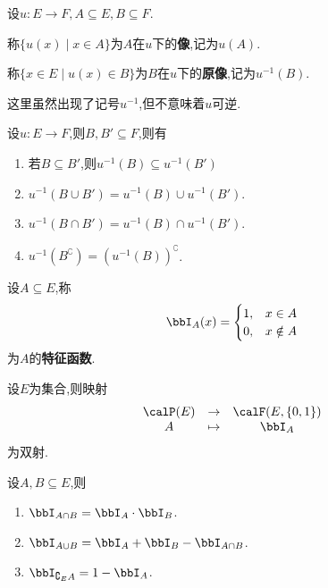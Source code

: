 \begin{deff}
    设$u: E \to F, A \subseteq E, B \subseteq F$.

    称$\{ u(x) \mid x \in A \}$为$A$在$u$下的\textbf{像},记为$u(A)$.

    称$\{ x \in E \mid u(x) \in B \}$为$B$在$u$下的\textbf{原像},记为$u^{-1}(B)$.
\end{deff}

\begin{rqq}
    这里虽然出现了记号$u^{-1}$,但不意味着$u$可逆.
\end{rqq}

\begin{prop}
    设$u: E \to F$,则$B, B' \subseteq F$,则有
    \begin{enumerate}
        \item 若$B \subseteq B'$,则$u^{-1}(B) \subseteq u^{-1}(B')$
        \item $u^{-1}(B \cup B') = u^{-1}(B) \cup u^{-1}(B')$.
        \item $u^{-1}(B \cap B') = u^{-1}(B) \cap u^{-1}(B')$.
        \item $u^{-1}(B^{\complement})=\left( u^{-1}(B) \right)^{\complement}$.
    \end{enumerate}
\end{prop}

\begin{deff}
    设$A \subseteq E$,称\[ \bbI_A(x) = \begin{cases} 1, & x \in A \\ 0, & x \notin A \end{cases} \]为$A$的\textbf{特征函数}.
\end{deff}

\begin{prop}
    设$E$为集合,则映射\[ \begin{array}[t]{ccc} \calP(E) & \to & \calF(E, \{ 0, 1 \}) \\ A & \tp & \bbI_A \end{array} \]为双射.
\end{prop}

\begin{prop}
    设$A, B \subseteq E$,则
    \begin{enumerate}
        \item $\bbI_{A \cap B} = \bbI_A \cdot \bbI_B$.
        \item $\bbI_{A \cup B} = \bbI_A + \bbI_B - \bbI_{A \cap B}$.
        \item $\bbI_{\complement_E A} = 1 - \bbI_A$.
    \end{enumerate}
\end{prop}

